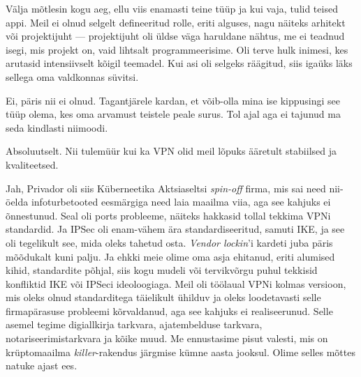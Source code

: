 
Välja mõtlesin kogu aeg, ellu viis enamasti teine tüüp ja kui vaja, tulid teised appi. Meil ei olnud selgelt defineeritud rolle, eriti alguses, nagu näiteks arhitekt või projektijuht --- projektijuht oli üldse väga haruldane 
nähtus, me ei teadnud isegi, mis projekt on, vaid lihtsalt programmeerisime. Oli terve hulk inimesi, kes arutasid 
intensiivselt kõigil teemadel. Kui asi oli selgeks räägitud, siis 
igaüks läks sellega oma valdkonnas süvitsi.


Ei, päris nii ei olnud. Tagantjärele kardan, et võib-olla mina ise 
kippusingi see tüüp olema, kes oma arvamust teistele peale surus. Tol 
ajal aga ei tajunud ma seda kindlasti niimoodi. 


Absoluutselt. Nii tulemüür kui ka VPN olid meil lõpuks 
ääretult stabiilsed ja kvaliteetsed. 

Jah, Privador oli siis Küberneetika Aktsiaseltsi \emph{spin-off} 
firma, mis sai need nii-öelda infoturbetooted eesmärgiga need laia 
maailma viia, aga see kahjuks ei õnnestunud. Seal oli ports 
probleeme, näiteks hakkasid tollal tekkima VPNi
standardid. Ja IPSec oli 
enam-vähem ära standardiseeritud, samuti IKE, ja see oli 
tegelikult see, mida oleks tahetud osta. \emph{Vendor lockin}'i kardeti juba päris 
mõõdukalt kuni palju. Ja ehkki meie olime oma asja ehitanud, eriti 
alumised kihid, standardite põhjal, siis kogu mudeli või tervikvõrgu puhul tekkisid konfliktid IKE või IPSeci ideoloogiaga. Meil oli töölaual VPNi kolmas versioon, mis oleks 
olnud standarditega täielikult ühilduv ja oleks loodetavasti selle firmapärasuse 
probleemi kõrvaldanud, aga see kahjuks ei realiseerunud. 
Selle asemel tegime digiallkirja tarkvara, ajatembelduse tarkvara, 
notariseerimistarkvara ja kõike muud. Me ennustasime pisut valesti, 
mis on krüptomaailma \emph{killer}-rakendus järgmise kümne aasta jooksul. 
Olime selles mõttes natuke ajast ees.

